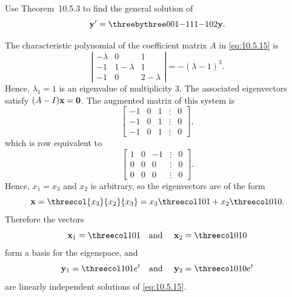 \setcounter{example}{4}
\setcounter{equation}{14}
\begin{example}
  \label{example:10.5.5}\rm Use Theorem~10.5.3 to find the general solution of
  \begin{equation}
    \label{eq:10.5.15}{\bf y}'=\threebythree001{-1}11{-1}02{\bf y}.
  \end{equation}
\end{example}
\setcounter{equation}{15}
\begin{examplesolution}
\solution The characteristic polynomial of the coefficient matrix $A$ in \eqref{eq:10.5.15} is
\[
  \left|
  \begin{array}{ccc}
    -\lambda & 0         & 1         \\
    -1       & 1-\lambda & 1         \\
    -1       & 0         & 2-\lambda
  \end{array}\right|=-(\lambda-1)^{3}.
\]
Hence, $\lambda_{1}=1$ is an eigenvalue of multiplicity $3$. The associated eigenvectors satisfy
$(A-I){\bf x}={\bf 0}$. The augmented matrix of this system is
\[
  \left[
  \begin{array}{rrrcr}
    -1 & 0 & 1 & \vdots & 0 \\
    -1 & 0 & 1 & \vdots & 0 \\
    -1 & 0 & 1 & \vdots & 0
  \end{array}\right],
\]
which is row equivalent to
\[
  \left[
  \begin{array}{rrrcr}
    1 & 0 & -1 & \vdots & 0 \\
    0 & 0 & 0  & \vdots & 0 \\
    0 & 0 & 0  & \vdots & 0
  \end{array}\right].
\]
Hence, $x_{1}=x_{3}$ and $x_{2}$ is arbitrary, so the eigenvectors are of the form
\[
  {\bf x}=\threecol{x_{3}}{x_{2}}{x_{3}}=x_{3}\threecol101+x_{2}\threecol010.
\]
Therefore the vectors
\begin{equation}
  \label{eq:10.5.16}{\bf x}_{1}=\threecol101\quad\mbox{and }\quad{\bf x}_{2}=\threecol010
\end{equation}
form a basis for the eigenspace, and
\[
  {\bf y}_{1}=\threecol101e^{t}\quad\mbox{and }\quad{\bf y}_{2}=\threecol010e^{t}
\]
are linearly independent solutions of \eqref{eq:10.5.15}.


\end{examplesolution}
